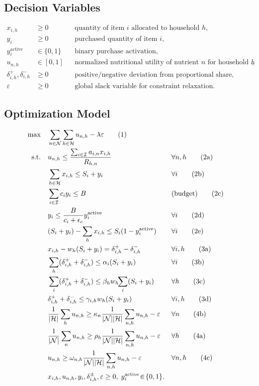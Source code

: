 \documentclass[preprint,12pt]{elsarticle}
\begin{document}
\subsection{Decision Variables}
\begin{align*}
x_{i,h} &\ge 0 && \text{quantity of item $i$ allocated to household $h$},\\
y_i &\ge 0 && \text{purchased quantity of item $i$},\\
y_i^{\mathrm{active}} &\in \{0,1\} && \text{binary purchase activation},\\
u_{n,h} &\in [0,1] && \text{normalized nutritional utility of nutrient $n$ for household $h$},\\
\delta_{i,h}^{+},\delta_{i,h}^{-} &\ge 0 && \text{positive/negative deviation from proportional share},\\
\varepsilon &\ge 0 && \text{global slack variable for constraint relaxation.}
\end{align*}

\subsection{Optimization Model}
\begin{align}
\max \quad & \sum_{n \in \mathcal{N}}\sum_{h \in \mathcal{H}} u_{n,h} - \lambda \varepsilon \tag{1}\\
\text{s.t.}\quad 
& u_{n,h} \le \frac{\sum_{i \in \mathcal{I}} a_{i,n} x_{i,h}}{R_{h,n}} && \forall n,h \tag{2a}\\
& \sum_{h \in \mathcal{H}} x_{i,h} \le S_i + y_i && \forall i \tag{2b}\\
& \sum_{i \in \mathcal{I}} c_i y_i \le B && \text{(budget)} \tag{2c}\\
& y_i \le \frac{B}{c_i+\epsilon_c} y_i^{\mathrm{active}} && \forall i \tag{2d}\\
& (S_i+y_i) - \sum_{h} x_{i,h} \le S_i(1-y_i^{\mathrm{active}}) && \forall i \tag{2e}\\
& x_{i,h} - w_h(S_i+y_i) = \delta_{i,h}^{+}-\delta_{i,h}^{-} && \forall i,h \tag{3a}\\
& \sum_{h} (\delta_{i,h}^{+}+\delta_{i,h}^{-}) \le \alpha_i (S_i+y_i) && \forall i \tag{3b}\\
& \sum_{i} (\delta_{i,h}^{+}+\delta_{i,h}^{-}) \le \beta_h w_h\!\!\sum_{i}(S_i+y_i) && \forall h \tag{3c}\\
& \delta_{i,h}^{+}+\delta_{i,h}^{-} \le \gamma_{i,h}w_h(S_i+y_i) && \forall i,h \tag{3d}\\
& \frac{1}{|\mathcal{H}|}\sum_{h} u_{n,h} \ge \kappa_n \frac{1}{|\mathcal{N}||\mathcal{H}|}\sum_{n,h} u_{n,h} - \varepsilon && \forall n \tag{4b}\\
& \frac{1}{|\mathcal{N}|}\sum_{n} u_{n,h} \ge \rho_h \frac{1}{|\mathcal{N}||\mathcal{H}|}\sum_{n,h} u_{n,h} - \varepsilon && \forall h \tag{4a}\\
& u_{n,h} \ge \omega_{n,h} \frac{1}{|\mathcal{N}||\mathcal{H}|}\sum_{n,h} u_{n,h} - \varepsilon && \forall n,h \tag{4c}\\
& x_{i,h},u_{n,h},y_i,\delta_{i,h}^{\pm},\varepsilon \ge 0,\; y_i^{\mathrm{active}}\!\in\!\{0,1\}. \notag
\end{align}
\end{document}
